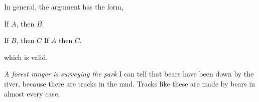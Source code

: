 \begin{exercises}
{\begin{enumerate}[label=(\roman*)]
In general, the argument has the form, 

\begin{earg*}
\item If $A$, then $B$
\item If $B$, then $C$
\itemc[.2] If $A$ then $C$.
\end{earg*}
which is valid. 

\end{enumerate}
}{\vspace{1.5in}}


\item \textit{A forest ranger is surveying the park} I can tell that bears have been down by the river, because there are tracks in the mud. Tracks like these are made by bears in almost every case. 


\end{exercises}

